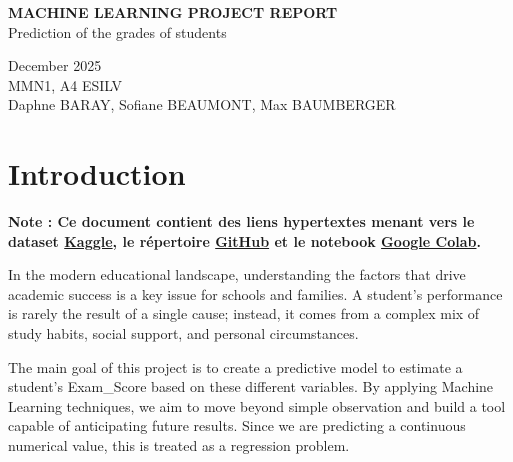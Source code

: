 \documentclass[a4paper,12pt]{article}
\begin{document}
\begin{titlepage}
    \vspace*{\fill}
    
    \begin{center}
        \Huge \textbf{MACHINE LEARNING PROJECT REPORT}\\[1cm]
        \Large Prediction of the grades of students
    \end{center}
    
    \vspace*{\fill}
    
    \begin{flushleft}
        December 2025\\[0.5cm]
        MMN1, A4 ESILV
        \large\\
        Daphne BARAY, Sofiane BEAUMONT, Max BAUMBERGER\\[0.5cm]
    \end{flushleft}
\end{titlepage}

\newpage

\tableofcontents
\newpage

\section{Introduction}

\noindent\textbf{\large Note : Ce document contient des liens hypertextes menant vers le dataset \href{https://www.kaggle.com/datasets/anassarfraz13/student-success-factors-and-insights/data }{Kaggle}, le répertoire \href{https://github.com/maxbaumberger/gradesprediction/}{GitHub} et le notebook \href{https://colab.research.google.com/drive/1d1VkLdJjlsVYWFKxfuNtNhik5k-nF-bh}{Google Colab}.}
\vspace{0.3cm}

In the modern educational landscape, understanding the factors that drive academic success is a key issue for schools and families. A student's performance is rarely the result of a single cause; instead, it comes from a complex mix of study habits, social support, and personal circumstances.

The main goal of this project is to create a predictive model to estimate a student's Exam\_Score based on these different variables. By applying Machine Learning techniques, we aim to move beyond simple observation and build a tool capable of anticipating future results. Since we are predicting a continuous numerical value, this is treated as a regression problem.
\end{document}
